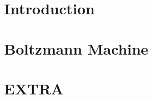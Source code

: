 \documentclass[a4paper,12pt,oneside,onecolumn,final,fleqn]{config/UERJ/repUERJ}
\begin{document}



\mainmatter


\chapter*{Introduction}
\label{ch:0}


\chapter{Boltzmann Machine}
\label{ch:1}


\chapter{EXTRA}
\label{ch:extra}


%

%


\end{document}

